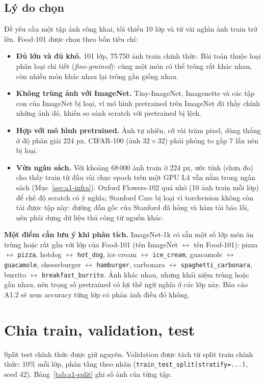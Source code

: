 \subsection{Lý do chọn}\label{sec:a1-reason}
Đề yêu cầu một tập ảnh công khai, tối thiểu 10 lớp và từ vài nghìn ảnh train trở lên. Food-101 được chọn theo bốn tiêu chí:
\begin{itemize}
\item \textbf{Đủ lớn và đủ khó.} 101 lớp, 75\,750 ảnh train chính thức. Bài toán thuộc loại phân loại chi tiết (\emph{fine-grained}): cùng một món có thể trông rất khác nhau, còn nhiều món khác nhau lại trông gần giống nhau.
\item \textbf{Không trùng ảnh với ImageNet.} Tiny-ImageNet, Imagenette và các tập con của ImageNet bị loại, vì mô hình pretrained trên ImageNet đã thấy chính những ảnh đó, khiến so sánh scratch với pretrained bị lệch.
\item \textbf{Hợp với mô hình pretrained.} Ảnh tự nhiên, cỡ vài trăm pixel, dùng thẳng ở độ phân giải 224 px. CIFAR-100 (ảnh \(32\times32\)) phải phóng to gấp 7 lần nên bị loại.
\item \textbf{Vừa ngân sách.} Với khoảng 68\,000 ảnh train ở 224 px, ước tính (chưa đo) cho thấy train từ đầu vài chục epoch trên một GPU L4 vẫn nằm trong ngân sách (Mục~\ref{sec:a1-infra}). Oxford Flowers-102 quá nhỏ (10 ảnh train mỗi lớp) để chế độ scratch có ý nghĩa; Stanford Cars bị loại vì torchvision không còn tải được tập này: đường dẫn gốc của Stanford đã hỏng và hàm tải báo lỗi, nên phải dựng dữ liệu thủ công từ nguồn khác.
\end{itemize}

\textbf{Một điểm cần lưu ý khi phân tích.} ImageNet-1k có sẵn một số lớp món ăn trùng hoặc rất gần với lớp của Food-101 (tên ImageNet \(\leftrightarrow\) tên Food-101): pizza \(\leftrightarrow\) \texttt{pizza}, hotdog \(\leftrightarrow\) \texttt{hot\_dog}, ice cream \(\leftrightarrow\) \texttt{ice\_cream}, guacamole \(\leftrightarrow\) \texttt{guacamole}, cheeseburger \(\leftrightarrow\) \texttt{hamburger}, carbonara \(\leftrightarrow\) \texttt{spaghetti\_carbonara}, burrito \(\leftrightarrow\) \texttt{breakfast\_burrito}. Ảnh khác nhau, nhưng khái niệm trùng hoặc gần nhau, nên trọng số pretrained có lợi thế ngữ nghĩa ở các lớp này. Báo cáo A1.2 sẽ xem accuracy từng lớp có phản ánh điều đó không.

\section{Chia train, validation, test}\label{sec:a1-split}
Split test chính thức được giữ nguyên. Validation được tách từ split train chính thức: 10\% mỗi lớp, phân tầng theo nhãn (\texttt{train\_test\_split(stratify=...)}, seed 42). Bảng~\ref{tab:a1-split} ghi số ảnh của từng tập.

